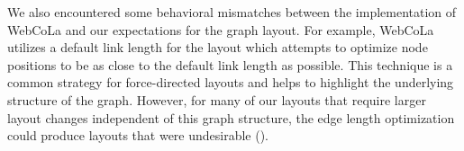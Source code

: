 We also encountered some behavioral mismatches between the implementation of WebCoLa and our expectations for the graph layout. For example, WebCoLa utilizes a default link length for the layout which attempts to optimize node positions to be as close to the default link length as possible. This technique is a common strategy for force-directed layouts  and helps to highlight the underlying structure of the graph. However, for many of our layouts that require larger layout changes independent of this graph structure, the edge length optimization could produce layouts that were undesirable ().

